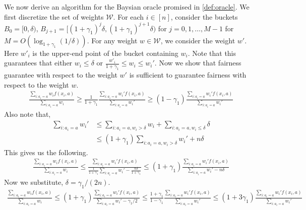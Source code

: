 \documentclass[11pt]{article}
\newcommand{\WW}{\mathcal{W}}
\newcommand{\norm}[1]{\lVert #1 \rVert}
\begin{document}
We now derive an algorithm for the Baysian oracle promised in \ref{def:oracle}. 
We first discretize the set of weights $\WW$. For each $i \in [n]$, consider the buckets $B_0 = [0,\delta)$, $B_{j+1} = [(1+\gamma_1)^j \delta, (1+\gamma_1)^{j+1}\delta)$ for $j=0,1,\ldots,M-1$ for $M = O(\log_{1+\gamma_1}(1/\delta) )$. For any weight $w\in \WW$, we consider the weight $w'$. Here $w'_i$ is the upper-end point of the bucket containing $w_i$. Note that this guarantees that either $w_i\le \delta$ or $\frac{w'_i}{1+\gamma_1} \le w_i \le w_i'$. Now we show that  fairness guarantee with respect to the weight $w'$ is sufficient to guarantee fairness with respect to the weight $w$. 
%
\begin{align*}
\frac{\sum_{i: a_i = a} w_i f(x_i,a)}{\sum_{i: a_i = a} w_i} \ge \frac{1}{1+\gamma_1}  \frac{\sum_{i: a_i = a} w_i' f(x_i,a)}{\sum_{i: a_i = a} w_i'} \ge (1-\gamma_1) \frac{\sum_{i: a_i = a} w_i' f(x_i,a)}{\sum_{i: a_i = a} w_i'} 
\end{align*}
Also note that,
\begin{align*}
\sum_{i: a_i = a} w_i' &\le \sum_{i:a_i = a, w_i > \delta} w_i + \sum_{i: a_i = a, w_i \le \delta} \delta \\
&\le (1+\gamma_1) \sum_{i:a_i = a, w_i > \delta} w_i' + n \delta
\end{align*}
This gives us the following.
\begin{align*}
\frac{\sum_{i: a_i = a} w_i f(x_i,a)}{\sum_{i: a_i = a} w_i} \le \frac{\sum_{i: a_i = a} w_i' f(x_i,a)}{\frac{1}{1+\gamma_1}\sum_{i: a_i = a} w_i' - \frac{n\delta}{1+\gamma_1} }  \le (1+\gamma_1) \frac{\sum_{i: a_i = a} w_i' f(x_i,a)}{\sum_{i: a_i = a} w_i' - n\delta } 
\end{align*}
Now we substitute, $\delta=\gamma_1/(2n)$. 
\begin{align}
\frac{\sum_{i: a_i = a} w_i f(x_i,a)}{\sum_{i: a_i = a} w_i} \le (1+\gamma_1) \frac{\sum_{i: a_i = a} w_i' f(x_i,a)}{\sum_{i: a_i = a} w_i' - \gamma_1/2} \le \frac{1+\gamma_1}{1-\gamma_1} \frac{\sum_{i: a_i = a} w_i' f(x_i,a)}{\sum_{i: a_i = a} w_i'} \le (1+3\gamma_1)  \frac{\sum_{i: a_i = a} w_i' f(x_i,a)}{\sum_{i: a_i = a} w_i'}
\end{align}
\end{document}
